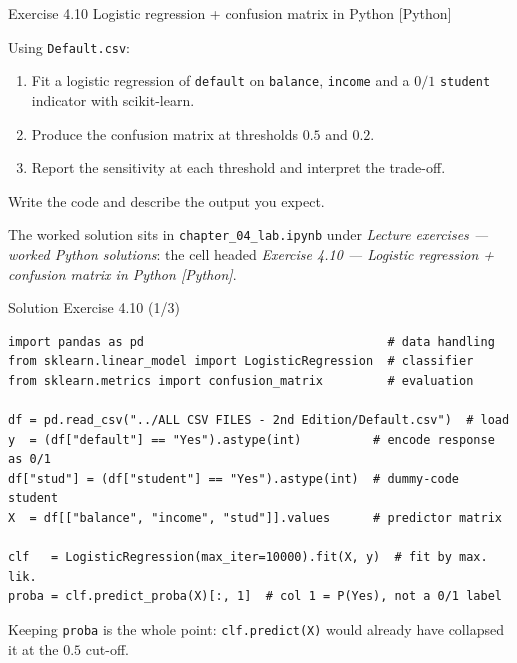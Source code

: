 \documentclass[aspectratio=169,11pt]{beamer}
\begin{document}

\begin{frame}{Exercise 4.10 \textemdash{} Logistic regression + confusion matrix in Python [Python]}
\begin{exercise}
Using \texttt{Default.csv}:
\begin{enumerate}
  \item Fit a logistic regression of \texttt{default} on
        \texttt{balance}, \texttt{income} and a $0/1$ \texttt{student}
        indicator with scikit-learn.
  \item Produce the confusion matrix at thresholds $0.5$ and $0.2$.
  \item Report the sensitivity at each threshold and interpret the
        trade-off.
\end{enumerate}
Write the code and describe the output you expect.
\end{exercise}
\begin{labnote}
  The worked solution sits in \texttt{chapter\_04\_lab.ipynb} under
  \emph{Lecture exercises --- worked Python solutions}: the cell headed
  \emph{Exercise 4.10 --- Logistic regression + confusion matrix in Python [Python]}.
\end{labnote}
\end{frame}

\begin{frame}[fragile]{Solution \textemdash{} Exercise 4.10 (1/3)}
\begin{solutionbox}
\begin{lstlisting}
import pandas as pd                                  # data handling
from sklearn.linear_model import LogisticRegression  # classifier
from sklearn.metrics import confusion_matrix         # evaluation

df = pd.read_csv("../ALL CSV FILES - 2nd Edition/Default.csv")  # load
y  = (df["default"] == "Yes").astype(int)          # encode response as 0/1
df["stud"] = (df["student"] == "Yes").astype(int)  # dummy-code student
X  = df[["balance", "income", "stud"]].values      # predictor matrix

clf   = LogisticRegression(max_iter=10000).fit(X, y)  # fit by max. lik.
proba = clf.predict_proba(X)[:, 1]  # col 1 = P(Yes), not a 0/1 label
\end{lstlisting}
\smallskip
Keeping \texttt{proba} is the whole point: \texttt{clf.predict(X)} would
already have collapsed it at the $0.5$ cut-off.
\end{solutionbox}
\end{frame}
\end{document}
